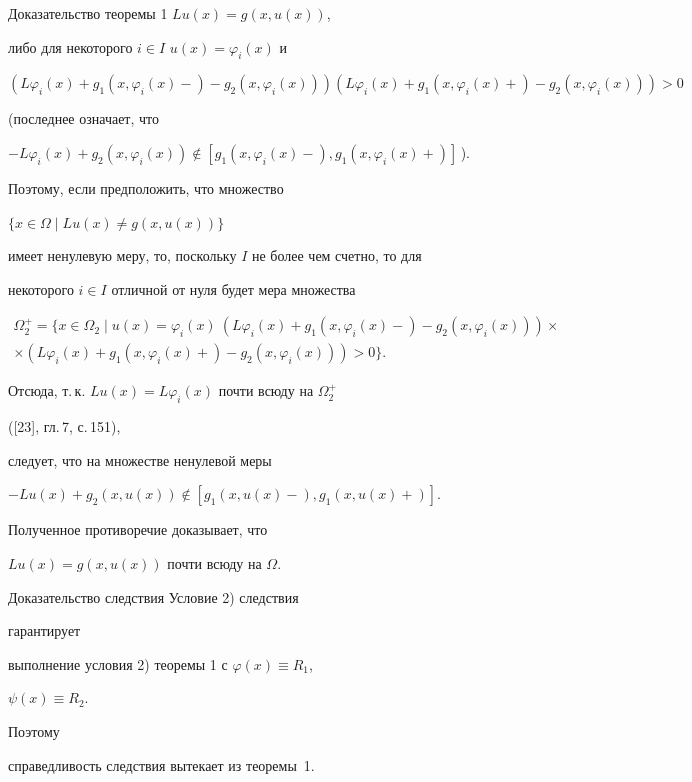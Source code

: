 \begin{pf*}{Доказательство теоремы 1}
$Lu(x)=g(x,u(x))$, 


либо для некоторого $i\in I$\; $u(x)=\varphi_i(x)$ и 


$(L\varphi_i(x)+g_1(x,\varphi_i(x)-)- 


g_2(x,\varphi_i(x)))(L\varphi_i(x)+g_1(x,\varphi_i(x)+)- 


g_2(x,\varphi_i(x)))>0$ 


(последнее означает, что 


$-L\varphi_i(x)+g_2(x,\varphi_i(x))\notin 


[g_1(x,\varphi_i(x)-),g_1(x,\varphi_i(x)+)]$\,). 


Поэтому, если предположить, что множество 


$\{x\in\Omega\mid Lu(x)\ne g(x,u(x))\}$ 


имеет ненулевую меру, то, поскольку $I$ не более чем счетно, то для 


некоторого $i\in I$ отличной от нуля будет мера множества 


\begin{multline*} 


\Omega^+_2=\{x\in\Omega_2\mid u(x)=\varphi_i(x)\ (L\varphi_i(x)+ 


g_1(x,\varphi_i(x)-)-g_2(x,\varphi_i(x)))\times \\ 


\times(L\varphi_i(x)+g_1(x,\varphi_i(x)+)- 


g_2(x,\varphi_i(x)))>0\}. 


\end{multline*} 


Отсюда, т.\,к. $Lu(x)=L\varphi_i(x)$ почти всюду на $\Omega^+_2$ 


([23], гл.\,7, с.\,151), 


следует, что на множестве ненулевой меры 


$-Lu(x)+g_2(x,u(x))\notin[g_1(x,u(x)-),g_1(x,u(x)+)]$. 


Полученное противоречие доказывает, что 


$Lu(x)=g(x,u(x))$ почти всюду на $\Omega$. 


\end{pf*} 


 


\begin{pf*}{Доказательство следствия} Условие 2) следствия


гарантирует 


выполнение условия 2) теоремы 1 с $\varphi(x)\!\equiv\! R_1$, 


$\psi(x)\!\equiv\! R_2$. 


Поэтому 


справедливость следствия вытекает из теоремы~1. 


\end{pf*} 


